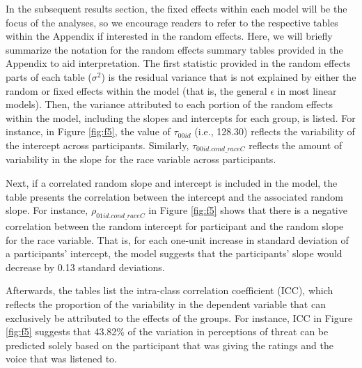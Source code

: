 \documentclass[
  english,
  man, noextraspace,floatsintext]{apa6}
\begin{document}
In the subsequent results section, the fixed effects within each model will be the focus of the analyses, so we encourage readers to refer to the respective tables within the Appendix if interested in the random effects. Here, we will briefly summarize the notation for the random effects summary tables provided in the Appendix to aid interpretation. The first statistic provided in the random effects parts of each table (\(\sigma^2\)) is the residual variance that is not explained by either the random or fixed effects within the model (that is, the general \(\epsilon\) in most linear models). Then, the variance attributed to each portion of the random effects within the model, including the slopes and intercepts for each group, is listed. For instance, in Figure \ref{fig:f5}, the value of \(\tau_{00 id}\) (i.e., 128.30) reflects the variability of the intercept across participants. Similarly, \(\tau_{00 id.cond\_raceC}\) reflects the amount of variability in the slope for the race variable across participants.

Next, if a correlated random slope and intercept is included in the model, the table presents the correlation between the intercept and the associated random slope. For instance, \(\rho_{01 id.cond\_raceC}\) in Figure \ref{fig:f5} shows that there is a negative correlation between the random intercept for participant and the random slope for the race variable. That is, for each one-unit increase in standard deviation of a participants' intercept, the model suggests that the participants' slope would decrease by 0.13 standard deviations.

Afterwards, the tables list the intra-class correlation coefficient (ICC), which reflects the proportion of the variability in the dependent variable that can exclusively be attributed to the effects of the groups. For instance, ICC in Figure \ref{fig:f5} suggests that 43.82\% of the variation in perceptions of threat can be predicted solely based on the participant that was giving the ratings and the voice that was listened to.
\end{document}
